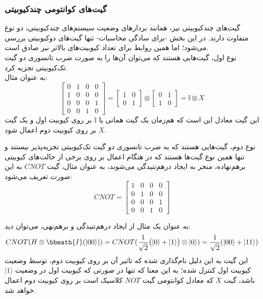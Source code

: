 \subsubsection{
    گیت‌های کوانتومی چند‌کیوبیتی
}
گیت‌های چندکیوبیتی نیز، همانند بردارهای وضعیت سیستم‌های چندکیوبیتی، دو نوع متفاوت دارند. در این بخش -برای سادگی محاسبات- تنها گیت‌های دوکیوبیتی بررسی می‌شود؛ اما همین روابط برای تعداد کیوبیت‌های بالاتر نیز صادق است. \\
نوع اول، گیت‌هایی هستند که می‌توان آن‌ها را به صورت ضرب تانسوری دو گیت تک‌کیوبیتی تجزیه کرد.
\\
به عنوان مثال:
\begin{equation}
    \begin{bmatrix}
    0 & 1 & 0 & 0 \\[3pt]
    1 & 0 & 0 & 0 \\[3pt]
    0 & 0 & 0 & 1 \\[3pt]
    0 & 0 & 1 & 0 
    \end{bmatrix} =
    \begin{bmatrix}
    1 & 0 \\[3pt]
    0 & 1 
    \end{bmatrix} \otimes
    \begin{bmatrix}
    0 & 1 \\[3pt]
    1 & 0
    \end{bmatrix}
    = \mathbb{I} \otimes X
\end{equation}
این گیت معادل این است که هم‌زمان یک گیت همانی یا
$\mathbb{I}$
بر روی کیوبیت اول و یک گیت
$X$
بر روی کیوبیت دوم اعمال شود.

نوع دوم، گیت‌هایی هستند که به ضرب تانسوری دو گیت تک‌کیوبیتی تجزیه‌پذیر نیستند و تنها همین نوع گیت‌ها هستند که در هنگام اعمال بر روی برخی از حالت‌های کیوبیتی برهم‌نهاده، منجر به ایجاد درهم‌تنیدگی می‌شوند، به عنوان مثال، گیت
$CNOT$ به این صورت تعریف می‌شود:
\begin{equation}
    CNOT = \begin{bmatrix}
    1 & 0 & 0 & 0 \\[3pt]
    0 & 1 & 0 & 0 \\[3pt]
    0 & 0 & 0 & 1 \\[3pt]
    0 & 0 & 1 & 0 
    \end{bmatrix}
\end{equation}

به عنوان یک مثال از ایجاد درهم‌تنیدگی و برهم‌نهی، می‌توان دید:
\begin{equation}
    CNOT(H \otimes \bbmath{I}(|00\rangle)) = CNOT(\frac{1}{\sqrt{2}} \big( |0\rangle + |1\rangle \big) \otimes |0\rangle ) = \frac{1}{\sqrt{2}} (|00\rangle + |11\rangle)
\end{equation}
این گیت به این دلیل نام‌گذاری شده که تاثیر آن بر روی کیوبیت دوم، توسط وضعیت کیوبیت اول کنترل شده؛ به این معنا که تنها در صورتی که کیوبیت اول در وضعیت
$|1\rangle$
باشد، گیت 
$X$
که معادل کوانتومی گیت
$NOT$
کلاسیک است بر روی کیوبیت دوم اعمال خواهد شد.

